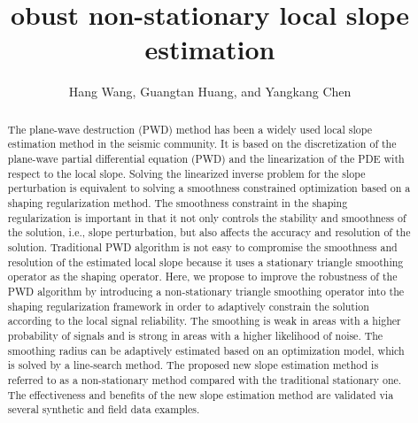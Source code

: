 
\title{obust non-stationary local slope estimation}
\renewcommand{\thefootnote}{\fnsymbol{footnote}}
\author{Hang Wang\footnotemark[1], Guangtan Huang\footnotemark[1], and Yangkang Chen\footnotemark[1]}


\address{
\footnotemark[1]
School of Earth Sciences\\
Zhejiang University\\
Hangzhou, Zhejiang Province, China, 310027\\
chenyk2016@gmail.com \\}



\DeclareRobustCommand{\old}[1]{}
\DeclareRobustCommand{\new}[1]{#1}
\DeclareRobustCommand{\dlo}[1]{}
\DeclareRobustCommand{\wen}[1]{#1}

\begin{abstract}
The plane-wave destruction (PWD) method has been a widely used local slope estimation method in the seismic community. It is based on the discretization of the plane-wave partial differential equation (PWD) and the linearization of the PDE with respect to the local slope. Solving the linearized inverse problem for the slope perturbation is equivalent to solving a smoothness constrained optimization based on a shaping regularization method. The smoothness constraint in the shaping regularization is important in that it not only controls the stability and smoothness of the solution, i.e., slope perturbation, but also affects the accuracy and resolution of the solution. Traditional PWD algorithm is not easy to compromise the smoothness and resolution of the estimated local slope because it uses a stationary triangle smoothing operator as the shaping operator. Here, we propose to improve the robustness of the PWD algorithm by introducing a non-stationary triangle smoothing operator into the shaping regularization framework in order to adaptively constrain the solution according to the local signal reliability. The smoothing is weak in areas with a higher probability of signals and is strong in areas with a higher likelihood of noise. The smoothing radius can be adaptively estimated based on an optimization model, which is solved by a line-search method. The proposed new slope estimation method is referred to as a non-stationary method compared with the traditional stationary one. The effectiveness and benefits of the new slope estimation method are validated via several synthetic and field data examples.
\end{abstract}

